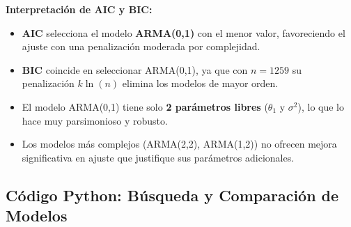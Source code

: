 \documentclass[12pt, a4paper]{article}
\begin{document}
\begin{notebox}
\textbf{Interpretación de AIC y BIC:}
\begin{itemize}[leftmargin=*,noitemsep]
  \item \textbf{AIC} selecciona el modelo \textbf{ARMA(0,1)} con el menor valor,
    favoreciendo el ajuste con una penalización moderada por complejidad.
  \item \textbf{BIC} coincide en seleccionar ARMA(0,1), ya que con $n = 1259$
    su penalización $k\ln(n)$ elimina los modelos de mayor orden.
  \item El modelo ARMA(0,1) tiene solo \textbf{2 parámetros libres}
    ($\theta_1$ y $\sigma^2$), lo que lo hace muy parsimonioso y robusto.
  \item Los modelos más complejos (ARMA(2,2), ARMA(1,2)) no ofrecen
    mejora significativa en ajuste que justifique sus parámetros adicionales.
\end{itemize}
\end{notebox}

\subsection{Código Python: Búsqueda y Comparación de Modelos}
\end{document}
